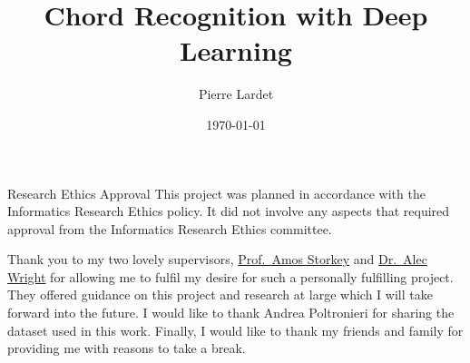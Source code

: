 \begin{preliminary}

    \title{Chord Recognition with Deep Learning}
    
    \author{Pierre Lardet}
    
    
    
    
    \date{\today}
    
    
    \maketitle
    
    \newenvironment{ethics}
       {\begin{frontenv}{Research Ethics Approval}{\LARGE}}
       {\end{frontenv}\newpage}
    
    \begin{ethics}
    This project was planned in accordance with the Informatics Research
    Ethics policy. It did not involve any aspects that required approval
    from the Informatics Research Ethics committee.
    
    \standarddeclaration
    \end{ethics}
    
    
    \begin{acknowledgements}
    Thank you to my two lovely supervisors, \hyperlink{https://homepages.inf.ed.ac.uk/amos/index.html}{Prof.~Amos Storkey} and \hyperlink{https://www.acoustics.ed.ac.uk/people/dr-alec-wright/}{Dr.~Alec Wright} for allowing me to fulfil my desire for such a personally fulfilling project. They offered guidance on this project and research at large which I will take forward into the future. I would like to thank Andrea Poltronieri for sharing the dataset used in this work. Finally, I would like to thank my friends and family for providing me with reasons to take a break.
    \end{acknowledgements}
    
    
    \tableofcontents
    \end{preliminary}